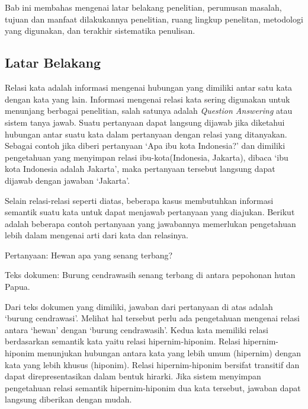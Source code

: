 \chapter{\babSatu}
Bab ini membahas mengenai latar belakang penelitian, perumusan masalah, tujuan dan manfaat dilakukannya penelitian, ruang lingkup penelitan, metodologi yang digunakan, dan terakhir sistematika penulisan. 


\section{Latar Belakang}
Relasi kata adalah informasi mengenai hubungan yang dimiliki antar satu kata dengan kata yang lain. Informasi mengenai relasi kata sering digunakan untuk menunjang berbagai penelitian, salah satunya adalah \textit{Question Answering} atau sistem tanya jawab. Suatu pertanyaan dapat langsung dijawab jika diketahui hubungan antar suatu kata dalam pertanyaan dengan relasi yang ditanyakan. Sebagai contoh jika diberi pertanyaan `Apa ibu kota Indonesia?' dan dimiliki pengetahuan yang menyimpan relasi ibu-kota(Indonesia, Jakarta), dibaca `ibu kota Indonesia adalah Jakarta', maka pertanyaan tersebut langsung dapat dijawab dengan jawaban `Jakarta'.

Selain relasi-relasi seperti diatas, beberapa kasus membutuhkan informasi semantik suatu kata untuk dapat menjawab pertanyaan yang diajukan. Berikut adalah beberapa contoh pertanyaan yang jawabannya memerlukan pengetahuan lebih dalam mengenai arti dari kata dan relasinya.

Pertanyaan: Hewan apa yang senang terbang?

Teks dokumen: Burung cendrawasih senang terbang di antara pepohonan hutan Papua.

Dari teks dokumen yang dimiliki, jawaban dari pertanyaan di atas adalah `burung cendrawasi'. Melihat hal tersebut perlu ada pengetahuan mengenai relasi antara `hewan' dengan `burung cendrawasih'. Kedua kata memiliki relasi berdasarkan semantik kata yaitu relasi hipernim-hiponim. Relasi hipernim-hiponim menunjukan hubungan antara kata yang lebih umum (hipernim) dengan kata yang lebih khusus (hiponim). Relasi hipernim-hiponim bersifat transitif dan dapat direpresentasikan dalam bentuk hirarki. Jika sistem menyimpan pengetahuan relasi semantik hipernim-hiponim dua kata tersebut, jawaban dapat langsung diberikan dengan mudah.

